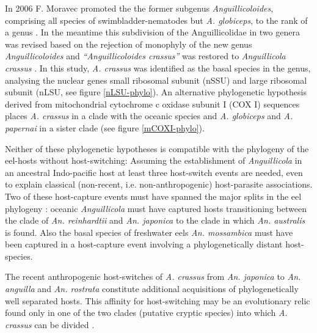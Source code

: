 In 2006 F. Moravec promoted the the former subgenus
\textit{Anguillicoloides}, comprising all species of
swimbladder-nematodes but \textit{A. globiceps}, to the rank of a
genus \cite{moravec_anguillicoloides}. In the meantime this
subdivision of the Anguillicolidae in two genera was revised based on
the rejection of monophyly of the new genus \textit{Anguillicoloides}
and \textit{``Anguillicoloides crassus''} was restored to
\textit{Anguillicola crassus} \cite{dl_py}. In this study,
\textit{A. crassus} was identified as the basal species in the genus,
analysing the nuclear genes small ribosomal subunit (nSSU) and large
ribosomal subunit (nLSU, see figure \ref{nLSU-phylo}). An alternative
phylogenetic hypothesis derived from mitochondrial cytochrome c
oxidase subunit I (COX I) sequences places \textit{A. crassus} in a
clade with the oceanic species and \textit{A. globiceps} and
\textit{A. papernai} in a sister clade (see figure \ref{mCOXI-phylo}).

Neither of these phylogenetic hypotheses is compatible with the
phylogeny of the eel-hosts without host-switching: Assuming the
establishment of \textit{Anguillicola} in an ancestral Indo-pacific
host at least three host-switch events are needed, even to explain
classical (non-recent, i.e. non-anthropogenic) host-parasite
associations. Two of these host-capture events must have spanned the
major splits in the eel phylogeny \cite{minegishi_molecular_2005}:
oceanic \textit{Anguillicola} must have captured hosts transitioning
between the clade of \textit{An. reinhardtii} and
\textit{An. japonica} to the clade in which \textit{An. australis} is
found. Also the basal species of freshwater eels
\textit{An. mossambica} must have been captured in a host-capture
event involving a phylogenetically distant host-species.


The recent anthropogenic host-switches of \textit{A. crassus} from
\textit{An. japonica} to \textit{An. anguilla} and
\textit{An. rostrata} constitute additional acquisitions of
phylogenetically well separated hosts. This affinity for
host-switching may be an evolutionary relic found only in one of the
two clades (putative cryptic species) into which \textit{A. crassus}
can be divided \cite{dl_py}.

